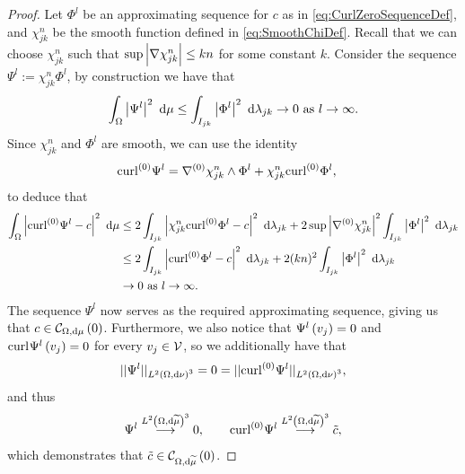 \begin{proof}
	Let $\Phi^l$ be an approximating sequence for $c$ as in \eqref{eq:CurlZeroSequenceDef}, and $\chi_{jk}^n$ be the smooth function defined in \eqref{eq:SmoothChiDef}.
	Recall that we can choose $\chi_{jk}^n$ such that $\sup\left\lvert \nabla\chi_{jk}^n \right\rvert\leq kn$ for some constant $k$.
	Consider the sequence $\Psi^l := \chi_{jk}^n \Phi^l$, by construction we have that
	\begin{align*}
		\int_{\Omega} \left\lvert \Psi^l \right\rvert^2  \ \mathrm{d}\mu \leq \int_{I_{jk}} \left\lvert \Phi^l \right\rvert^2  \ \mathrm{d}\lambda_{jk} \rightarrow 0 \ \text{as} \ l \rightarrow\infty.
	\end{align*}
	Since $\chi_{jk}^n$ and $\Phi^l$ are smooth, we can use the identity
	\begin{align*}
		\mathrm{curl}_{}^{(0)}\Psi^l &= \nabla^{(0)}\chi_{jk}^n\wedge\Phi^l + \chi_{jk}^n\mathrm{curl}_{}^{(0)}\Phi^l,
	\end{align*}
	to deduce that
	\begin{align*}
		\int_{\Omega} \left\lvert  \mathrm{curl}_{}^{(0)}\Psi^l - c  \right\rvert^2  \ \mathrm{d}\mu
		&\leq 2\int_{I_{jk}} \left\lvert  \chi_{jk}^n\mathrm{curl}_{}^{(0)}\Phi^l - c  \right\rvert^2  \ \mathrm{d}\lambda_{jk}
		+ 2\sup\left\lvert \nabla^{(0)}\chi_{jk}^n \right\rvert^2 \int_{I_{jk}} \left\lvert  \Phi^l  \right\rvert^2  \ \mathrm{d}\lambda_{jk} \\
		&\leq2\int_{I_{jk}} \left\lvert  \mathrm{curl}_{}^{(0)}\Phi^l - c  \right\rvert^2  \ \mathrm{d}\lambda_{jk}
		+ 2(kn)^2 \int_{I_{jk}} \left\lvert  \Phi^l  \right\rvert^2  \ \mathrm{d}\lambda_{jk} \\
		&\rightarrow 0 \ \text{as} \ l \rightarrow\infty.
	\end{align*}
	The sequence $\Psi^l$ now serves as the required approximating sequence, giving us that $c\in\mathcal{C}_{ \Omega, \mathrm{d}\mu}\left( 0 \right)$.
	Furthermore, we also notice that $\Psi^l\left( v_j \right)=0$ and $\mathrm{curl}_{}\Psi^l\left( v_j \right)=0$ for every $v_j\in\mathcal{V}$, so we additionally have that
	\begin{align*}
		\lvert\lvert \Psi^l \rvert\rvert_ {L^{2}\left( \Omega,\mathrm{d} \nu \right)^3} = 0
		= \lvert\lvert \mathrm{curl}_{}^{(0)}\Psi^l \rvert\rvert_{L^{2}\left( \Omega,\mathrm{d} \nu \right)^3},
	\end{align*}
	and thus
	\begin{align*}
		\Psi^l \overset{L^{2}\left( \Omega,\mathrm{d} \widetilde{\mu} \right)^3}{\longrightarrow} 0, 
		\qquad
		\mathrm{curl}_{}^{(0)}\Psi^l \overset{L^{2}\left( \Omega,\mathrm{d} \widetilde{\mu} \right)^3}{\longrightarrow} \tilde{c},
	\end{align*}
	which demonstrates that $\tilde{c}\in\mathcal{C}_{ \Omega, \mathrm{d}\widetilde{\mu}}\left( 0 \right)$.
\end{proof}

